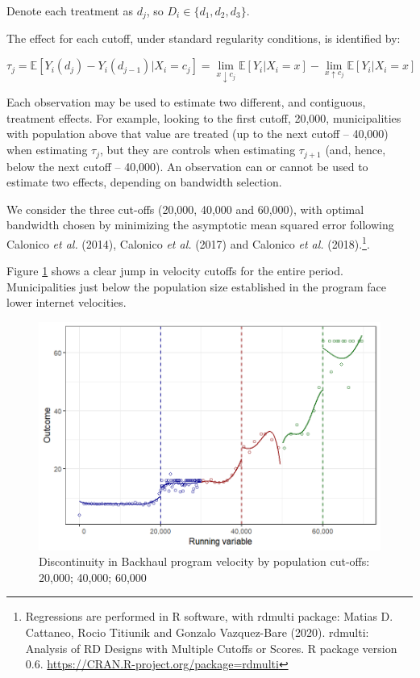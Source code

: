 \documentclass[
  12pt,
]{article}
\begin{document}
Denote each treatment as \(d_j\), so \(D_i \in \{d_1,d_2,d_3\}\).

The effect for each cutoff, under standard regularity conditions, is
identified by:

\begin{equation}
\tau_j= \mathbb{E}[Y_i(d_j) - Y_i(d_{j-1})|X_i=c_j]= \lim\limits_{x \downarrow c_j}\mathbb{E}[Y_i|X_i=x]-\lim\limits_{x \uparrow c_j}\mathbb{E}[Y_i|X_i=x]
\label{eq:1}
\end{equation}

Each observation may be used to estimate two different, and contiguous,
treatment effects. For example, looking to the first cutoff, 20,000,
municipalities with population above that value are treated (up to the
next cutoff -- 40,000) when estimating \(\tau_j\), but they are controls
when estimating \(\tau_{j+1}\) (and, hence, below the next cutoff --
40,000). An observation can or cannot be used to estimate two effects,
depending on bandwidth selection.

We consider the three cut-offs (20,000, 40,000 and 60,000), with optimal
bandwidth chosen by minimizing the asymptotic mean squared error
following Calonico \emph{et al.} (2014), Calonico \emph{et al.} (2017)
and Calonico \emph{et al.} (2018).\footnote{Regressions are performed in
  R software, with rdmulti package: Matias D. Cattaneo, Rocio Titiunik
  and Gonzalo Vazquez-Bare (2020). rdmulti: Analysis of RD Designs with
  Multiple Cutoffs or Scores. R package version 0.6.
  \url{https://CRAN.R-project.org/package=rdmulti}}.

Figure \ref{fig:2} shows a clear jump in velocity cutoffs for the entire
period. Municipalities just below the population size established in the
program face lower internet velocities.

\begin{figure}
\centering
\includegraphics{artigo1_files/figure-latex/discontinuity-1.png}
\caption{Discontinuity in Backhaul program velocity by population
cut-offs: 20,000; 40,000; 60,000 \label{fig:2}}
\end{figure}
\end{document}
